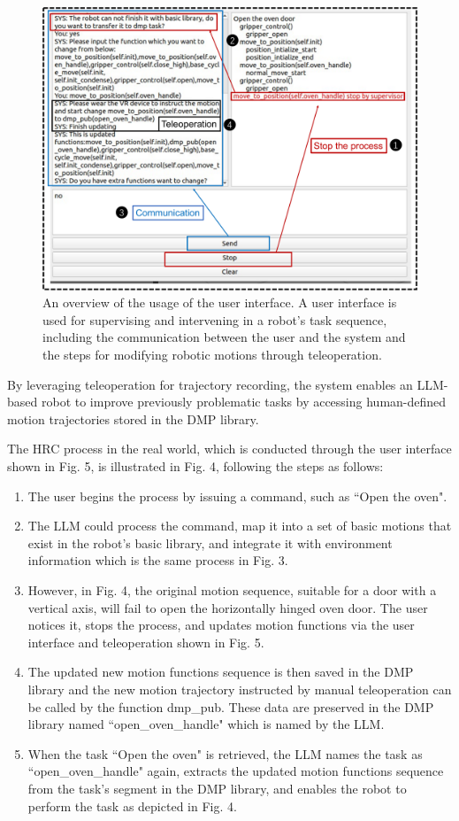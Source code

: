 \documentclass[letterpaper,conference]{ieeeconf}
\begin{document}
\begin{figure}[t]
    \centering
    \includegraphics[width=0.79\linewidth]{ui.pdf}
    \captionsetup{skip=1pt}
    \caption{An overview of the usage of the user interface. A user interface is used for supervising and intervening in a robot’s task sequence, including the communication between the user and the system and the steps for modifying robotic motions through teleoperation.}
    \label{fig:ui}
 \vspace{-6mm}
\end{figure}

By leveraging teleoperation for trajectory recording, the system enables an LLM-based robot to improve previously problematic tasks by accessing human-defined motion trajectories stored in the DMP library.

The HRC process in the real world, which is conducted through the user interface shown in Fig. 5, is illustrated in Fig. 4, following the steps as follows:
\begin{enumerate}
    \item The user begins the process by issuing a command, such as ``Open the oven".
    \item The LLM could process the command, map it into a set of basic motions that exist in the robot's basic library, and integrate it with environment information which is the same process in Fig. 3.
    \item However, in Fig. 4, the original motion sequence, suitable for a door with a vertical axis, will fail to open the horizontally hinged oven door. The user notices it, stops the process, and updates motion functions via the user interface and teleoperation shown in Fig. 5.
    \item The updated new motion functions sequence is then saved in the DMP library and the new motion trajectory instructed by manual teleoperation can be called by the function \textquotesingle dmp\_pub\textquotesingle. These data are preserved in the DMP library named ``open\_oven\_handle" which is named by the LLM.
    \item When the task ``Open the oven" is retrieved, the LLM names the task as ``open\_oven\_handle" again, extracts the updated motion functions sequence from the task’s segment in the DMP library, and enables the robot to perform the task as depicted in Fig. 4.
\end{enumerate}
\end{document}

